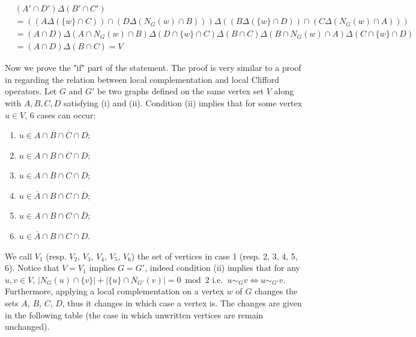 \documentclass[a4paper,UKenglish,cleveref,autoref,thm-restate]{arxiv}
\newcommand{\Ncom}[1]{\begin{color}{blue!80!black} \texttt{\small[NC: #1]}\end{color}}
\begin{document}
\begin{align*}
    & (A'\cap D')\Delta(B'\cap C')\\
    &= \left((A \Delta ( \{w\}\cap C))\cap (D \Delta ( N_{G}(w)\cap B))\right)\Delta\left((B \Delta ( \{w\}\cap D))\cap (C \Delta ( N_{G}(w)\cap A))\right)\\
    &= (A\cap D)\Delta(A\cap N_{G}(w)\cap B)\Delta(D\cap \{w\}\cap C)\Delta(B\cap C)\Delta(B \cap  N_{G}(w)\cap A)\Delta(C \cap\{w\}\cap D)\\
    &=(A\cap D)\Delta(B\cap C) = V
\end{align*}

Now we prove the "if" part of the statement. The proof is very similar to a proof in \cite{claudet2024local} regarding the relation between local complementation and local Clifford operators. Let $G$ and $G'$ be two graphs defined on the same vertex set $V$ along with $A, B, C, D$ satisfying (i) and (ii). Condition (ii) implies that for some vertex $u \in V$, 6 cases can occur:
\begin{enumerate}
    \item $u \in A \cap \overline B \cap \overline C \cap D$; %
    \item $u \in A \cap B \cap \overline C \cap D$; %
    \item $u \in A \cap \overline B \cap C \cap D$; %
    \item $u \in \overline A \cap B \cap C \cap \overline D$; %
    \item $u \in A \cap B \cap C \cap \overline D$; %
    \item $u \in \overline A \cap B \cap C \cap D$. %
\end{enumerate}
We call $V_1$ (resp. $V_2$, $V_3$, $V_4$, $V_5$, $V_6$) the set of vertices in case 1 (resp. 2, 3, 4, 5, 6). Notice that $V = V_1$ implies $G = G'$, indeed condition (ii) implies that for any $u,v \in V$, $|N_G(u)\cap \{v\}| +  |\{u\}\cap N_{G'}(v)| = 0 \bmod 2$ i.e.~$u \sim_G v \Leftrightarrow u \sim_{G'} v$. Furthermore, applying a local complementation on a vertex $w$ of $G$ changes the sets $A$, $B$, $C$, $D$, thus it changes in which case a vertex is. The changes are given in the following table (the case in which unwritten vertices are remain unchanged). 
\end{document}
